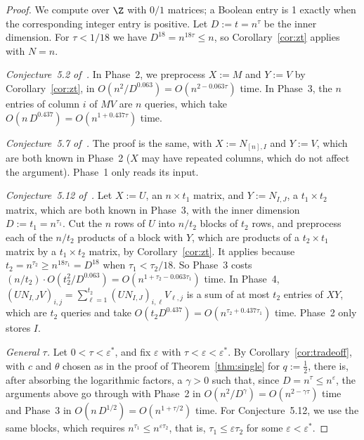 \begin{proof}
We compute over $\Z$ with $0/1$ matrices; a Boolean entry is 1 exactly when the corresponding integer entry is positive. Let $D:=t=n^\tau$ be the inner dimension. For $\tau<1/18$ we have $D^{18}=n^{18\tau}\le n$, so Corollary~\ref{cor:zt} applies with $N=n$.

\emph{Conjecture~5.2 of~\cite{BNS19}.} In Phase~2, we preprocess $X:=M$ and $Y:=V$ by Corollary~\ref{cor:zt}, in $O(n^2/D^{0.063})=O(n^{2-0.063\tau})$ time. In Phase~3, the $n$ entries of column $i$ of $MV$ are $n$ queries, which take $O(n\,D^{0.437})=O(n^{1+0.437\tau})$ time.

\emph{Conjecture~5.7 of~\cite{BNS19}.} The proof is the same, with $X:=N_{[n],I}$ and $Y:=V$, which are both known in Phase~2 ($X$ may have repeated columns, which do not affect the argument). Phase~1 only reads its input.

\emph{Conjecture~5.12 of~\cite{BNS19}.} Let $X:=U$, an $n\times t_1$ matrix, and $Y:=N_{I,J}$, a $t_1\times t_2$ matrix, which are both known in Phase~3, with the inner dimension $D:=t_1=n^{\tau_1}$. Cut the $n$ rows of $U$ into $n/t_2$ blocks of $t_2$ rows, and preprocess each of the $n/t_2$ products of a block with $Y$, which are products of a $t_2\times t_1$ matrix by a $t_1\times t_2$ matrix, by Corollary~\ref{cor:zt}. It applies because $t_2=n^{\tau_2}\ge n^{18\tau_1}=D^{18}$ when $\tau_1<\tau_2/18$. So Phase~3 costs $(n/t_2)\cdot O(t_2^2/D^{0.063})=O(n^{1+\tau_2-0.063\tau_1})$ time. In Phase~4, $(UN_{I,J}V)_{i,j}=\sum_{\ell=1}^{t_2}(UN_{I,J})_{i,\ell}V_{\ell,j}$ is a sum of at most $t_2$ entries of $XY$, which are $t_2$ queries and take $O(t_2D^{0.437})=O(n^{\tau_2+0.437\tau_1})$ time. Phase~2 only stores $I$.

\emph{General $\tau$.} Let $0<\tau<\varepsilon^*$, and fix $\varepsilon$ with $\tau<\varepsilon<\varepsilon^*$. By Corollary~\ref{cor:tradeoff}, with $c$ and $\theta$ chosen as in the proof of Theorem~\ref{thm:single} for $q:=\frac12$, there is, after absorbing the logarithmic factors, a $\gamma>0$ such that, since $D=n^\tau\le n^\varepsilon$, the arguments above go through with Phase~2 in $O(n^2/D^\gamma)=O(n^{2-\gamma\tau})$ time and Phase~3 in $O(n\,D^{1/2})=O(n^{1+\tau/2})$ time. For Conjecture~5.12, we use the same blocks, which requires $n^{\tau_1}\le n^{\varepsilon\tau_2}$, that is, $\tau_1\le\varepsilon\tau_2$ for some $\varepsilon<\varepsilon^*$.
\end{proof}

